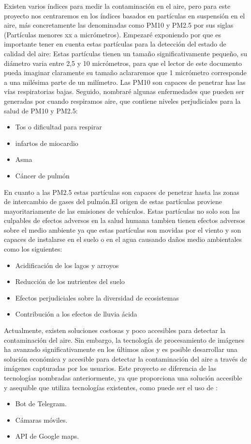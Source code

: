 Existen varios índices para medir la contaminación en el aire, pero para este proyecto nos centraremos en los índices basados en partículas en suspensión en el aire, más concretamente las denominadas como PM10  y PM2.5 por sus siglas (Partículas menores xx a micrómetros).
Empezaré exponiendo por que es importante tener en cuenta estas partículas para la detección del estado de calidad del aire:
Estas partículas tienen un tamaño significativamente pequeño, su diámetro varia entre 2,5 y 10 micrómetros, para que el lector de este documento pueda imaginar claramente su tamaño aclararemos que 1 micrómetro corresponde a una milésima parte de un milímetro.
Las PM10 son capaces de penetrar has las vías respiratorias bajas.
Seguido, nombraré algunas enfermedades que pueden ser generadas por cuando respiramos aire, que contiene niveles perjudiciales para la salud de PM10 y PM2.5:\\

\begin{itemize}
    \item Tos o dificultad para respirar
    \item infartos de miocardio
    \item Asma
    \item Cáncer de pulmón
\end{itemize}
En cuanto a las PM2.5 estas partículas son capaces de penetrar hasta las zonas de intercambio de gases del pulmón.El origen de estas partículas proviene  mayoritariamente de las emisiones de vehículos.
Estas partículas no solo son las culpables de efectos adversos en la salud humana tambien tienen efectos adversos sobre el medio ambiente ya que estas partículas son movidas por el viento y son capaces de instalarse en el suelo o en el agua causando daños medio ambientales como los siguientes:\\
\begin{itemize}
    \item Acidificación de los lagos y arroyos
    \item Reducción de los nutrientes del suelo
    \item Efectos perjudiciales sobre la diversidad de ecosistemas
    \item Contribución a los efectos de lluvia ácida
\end{itemize}




Actualmente, existen soluciones costosas y poco accesibles para detectar la contaminación del aire. Sin embargo, la tecnología de procesamiento de imágenes ha avanzado significativamente en los últimos años y es posible desarrollar una solución económica y accesible para detectar la contaminación del aire a través de imágenes capturadas por los usuarios. Este proyecto se diferencia de las tecnologías nombradas anteriormente, ya que proporciona una solución accesible y asequible que utiliza tecnologías existentes, como puede ser el uso de :
\begin{itemize}
    \item  Bot de Telegram.
    \item Cámaras móviles.
    \item API de Google maps.
\end{itemize}

